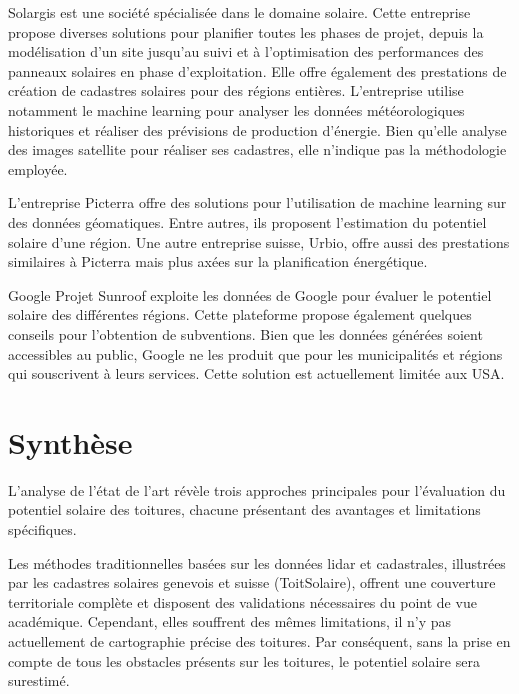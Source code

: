 Solargis \cite{solargis_regional_nodate} est une société spécialisée dans le domaine solaire. Cette entreprise propose diverses solutions pour planifier toutes les phases de projet, depuis la modélisation d'un site jusqu'au suivi et à l'optimisation des performances des panneaux solaires en phase d'exploitation. Elle offre également des prestations de création de cadastres solaires pour des régions entières. L'entreprise utilise notamment le machine learning \cite{solargis_temporal_nodate} pour analyser les données météorologiques historiques et réaliser des prévisions de production d'énergie. Bien qu'elle analyse des images satellite pour réaliser ses cadastres, elle n'indique pas la méthodologie employée.

\par{L'entreprise Picterra \cite{picterra_infrastructure_nodate} offre des solutions pour l'utilisation de machine learning sur des données géomatiques. Entre autres, ils proposent l'estimation du potentiel solaire d'une région. Une autre entreprise suisse, Urbio, \cite{urbio_urbio_nodate} offre aussi des prestations similaires à Picterra mais plus axées sur la planification énergétique.}
\par{Google Projet Sunroof \cite{google_project_nodate} exploite les données de Google pour évaluer le potentiel solaire des différentes régions. Cette plateforme propose également quelques conseils pour l'obtention de subventions. Bien que les données générées soient accessibles au public, Google ne les produit que pour les municipalités et régions qui souscrivent à leurs services. Cette solution est actuellement limitée aux USA.}

\section{Synthèse}

\par{L'analyse de l'état de l'art révèle trois approches principales pour l'évaluation du potentiel solaire des toitures, chacune présentant des avantages et limitations spécifiques.}

\par{Les méthodes traditionnelles basées sur les données \gls{lidar} et cadastrales, illustrées par les cadastres solaires genevois et suisse (ToitSolaire), offrent une couverture territoriale complète et disposent des validations nécessaires du point de vue académique. Cependant, elles souffrent des mêmes limitations, il n'y pas actuellement de cartographie précise des toitures. Par conséquent, sans la prise en compte de tous les obstacles présents sur les toitures, le potentiel solaire sera surestimé.}

